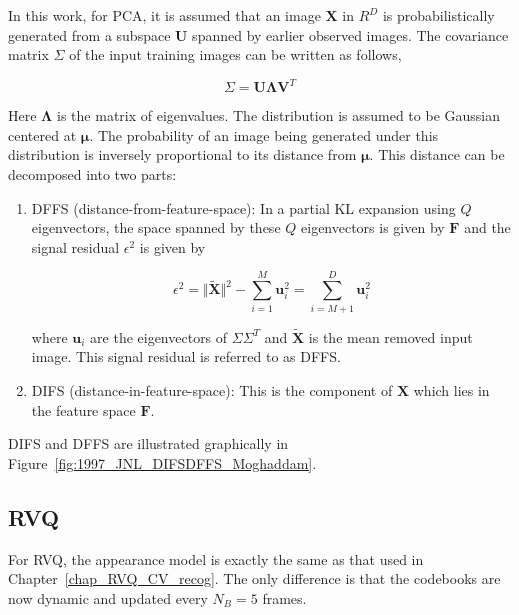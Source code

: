 In this work, for PCA, it is assumed that an image $\mathbf{X}$ in $R^D$ is probabilistically generated from a subspace $\mathbf{U}$ spanned by earlier observed images.  The covariance matrix $\Sigma$ of the input training images can be written as follows,  

\begin{equation}
\Sigma = \mathbf{U}\mathbf{\Lambda} \mathbf{V}^T
\end{equation}

Here $\mathbf{\Lambda}$ is the matrix of eigenvalues.  The distribution is assumed to be Gaussian centered at $\mathbf{\mu}$.  The probability of an image being generated under this distribution is inversely proportional to its distance from $\mathbf{\mu}$.  This distance can be decomposed into two parts:

\begin{enumerate}
\item DFFS (distance-from-feature-space):  In a partial KL expansion using $Q$ eigenvectors, the space spanned by these $Q$ eigenvectors is given by $\mathbf{F}$ and the signal residual $\epsilon^2$ is given by

\begin{equation}
\epsilon^2 = \Vert \tilde{\mathbf{X}} \Vert^2 - \sum\limits_{i=1}^M \mathbf{u}_i^2 = \sum\limits_{i=M+1}^D \mathbf{u}_i^2
\end{equation}

where $\mathbf{u}_i$ are the eigenvectors of $\Sigma\Sigma^T$ and $\tilde{\mathbf{X}}$ is the mean removed input image.  This signal residual is referred to as DFFS.
\item DIFS (distance-in-feature-space):  This is the component of $\mathbf{X}$ which lies in the feature space $\mathbf{F}$.  
\end{enumerate}

DIFS and DFFS are illustrated graphically in Figure~\ref{fig:1997_JNL_DIFSDFFS_Moghaddam}.  

%
%

\subsection{RVQ}
\label{Sec:Chap5_RVQ}
For RVQ, the appearance model is exactly the same as that used in Chapter~\ref{chap_RVQ_CV_recog}.  The only difference is that the codebooks are now dynamic and updated every $N_B=5$ frames. 

